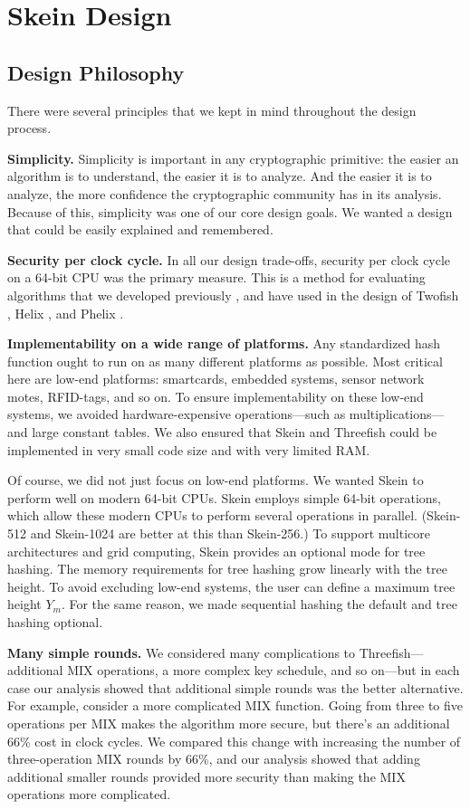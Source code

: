 \documentclass[11pt,twoside]{article}
\begin{document}
\section{Skein Design}

\subsection{Design Philosophy}

There were several principles that we kept in mind throughout the design
process.

{\bf Simplicity.}  Simplicity is important in any cryptographic primitive: the easier an algorithm is to understand, the easier it is to analyze.  And the easier it is to analyze, the more confidence the cryptographic community has in its analysis.  Because of this, simplicity was one of our core design goals.  We wanted a design that could be easily explained and remembered.

{\bf Security per clock cycle.}  In all our design trade-offs, security per clock cycle on a 64-bit CPU was the primary measure.  This is a method for evaluating algorithms that we developed previously \cite{SW97}, and have used in the design of Twofish \cite{Twofish}, Helix \cite{Helix}, and Phelix \cite{Phelix}.

{\bf Implementability on a wide range of platforms.} Any standardized hash function ought to run on as many different platforms as possible. Most critical here are low-end platforms: smartcards, embedded systems, sensor network motes, RFID-tags, and so on.  To ensure implementability on these low-end systems, we avoided hardware-expensive operations---such as multiplications---and large constant tables.  We also ensured that Skein and Threefish could be implemented in very small code size and with very limited RAM.

Of course, we did not just focus on low-end platforms. We wanted Skein to perform well on modern 64-bit CPUs. Skein employs simple 64-bit operations, which allow these modern CPUs to perform several operations in parallel. (Skein-512 and Skein-1024 are better at this than Skein-256.) To support multicore architectures and grid computing, Skein provides an optional mode for tree hashing. The memory requirements for tree hashing grow linearly with the tree height. To avoid excluding low-end systems, the user can define a maximum tree height $Y_m$. For the same reason, we made sequential hashing the default and tree hashing optional.

{\bf Many simple rounds.}  We considered many complications to Threefish---additional MIX operations, a more complex key schedule, and so on---but in each case our analysis showed that additional simple rounds was the better alternative.  For example, consider a more complicated MIX function.  Going from three to five operations per MIX makes the algorithm more secure, but there's an additional 66\% cost in clock cycles.  We compared this change with increasing the number of three-operation MIX rounds by 66\%, and our analysis showed that adding additional smaller rounds provided more security than making the MIX operations more complicated.
\end{document}
